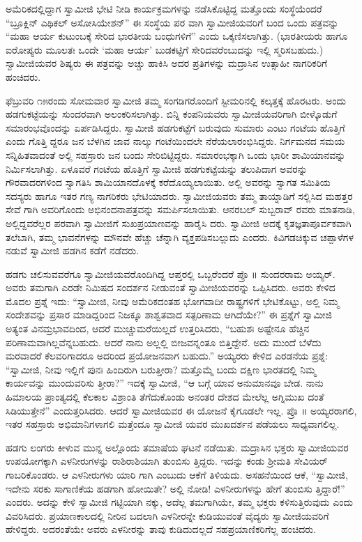 ಅಮೆರಿಕದಲ್ಲಿದ್ದಾಗ ಸ್ವಾಮೀಜಿ ಭೇಟಿ ನೀಡಿ ಕಾರ್ಯಕ್ರಮಗಳನ್ನು ನಡೆಸಿಕೊಟ್ಟಿದ್ದ ಮತ್ತೊಂದು ಸಂಸ್ಥೆಯೆಂದರೆ “ಬ್ರೂಕ್ಲಿನ್ ಎಥಿಕಲ್ ಅಸೋಸಿಯೇಶನ್​” ಈ ಸಂಸ್ಥೆಯ ಪರ ವಾಗಿ ಸ್ವಾಮೀಜಿಯವರಿಗೆ ಬಂದ ಒಂದು ಪತ್ರವನ್ನು “ಮಹಾ ಆರ್ಯ ಕುಟುಂಬಕ್ಕೆ ಸೇರಿದ ಭಾರತೀಯ ಬಂಧುಗಳಿಗೆ” ಎಂದು ಒಕ್ಕಣಿಸಲಾಗಿತ್ತು. (ಭಾರತೀಯರು ಹಾಗೂ ಐರೋಪ್ಯರು ಮೂಲತಃ ಒಂದೇ ‘ಮಹಾ ಆರ್ಯ’ ಬುಡಕಟ್ಟಿಗೆ ಸೇರಿದವರೆಂಬುದನ್ನು ಇಲ್ಲಿ ಸ್ಮರಿಸಬಹುದು.) ಸ್ವಾಮೀಜಿಯವರ ಶಿಷ್ಯರು ಈ ಪತ್ರವನ್ನು ಅಚ್ಚು ಹಾಕಿಸಿ ಅದರ ಪ್ರತಿಗಳನ್ನು ಮದ್ರಾಸಿನ ಉತ್ಸಾಹೀ ನಾಗರಿಕರಿಗೆ ಹಂಚಿದರು.

ಫೆಬ್ರುವರಿ ೧೫ರಂದು ಸೋಮವಾರ ಸ್ವಾಮೀಜಿ ತಮ್ಮ ಸಂಗಡಿಗರೊಂದಿಗೆ ಸ್ಟೀಮರಿನಲ್ಲಿ ಕಲ್ಕತ್ತಕ್ಕೆ ಹೊರಟರು. ಅಂದು ಹಡಗುಕಟ್ಟೆಯನ್ನು ಸುಂದರವಾಗಿ ಅಲಂಕರಿಸಲಾಗಿತ್ತು. ಬಿನ್ನಿ ಕಂಪನಿಯವರು ಸ್ವಾಮೀಜಿಯವರಿಗಾಗಿ ಬೀಳ್ಕೊಡುಗೆ ಸಮಾರಂಭವೊಂದನ್ನು ಏರ್ಪಡಿಸಿದ್ದರು. ಸ್ವಾಮೀಜಿ ಹಡಗುಕಟ್ಟೆಗೆ ಬರುವುದು ಸುಮಾರು ಎಂಟು ಗಂಟೆಯ ಹೊತ್ತಿಗೆ ಎಂದು ಗೊತ್ತಿ ದ್ದರೂ ಜನ ಬೆಳಗಿನ ಜಾವ ನಾಲ್ಕು ಗಂಟೆಯಿಂದಲೇ ನೆರೆಯಲಾರಂಭಿಸಿದ್ದರು. ನಿರ್ಗಮನದ ಸಮಯ ಸನ್ನಿಹಿತವಾದಂತೆ ಅಲ್ಲಿ ಸಹಸ್ರಾರು ಜನ ಬಂದು ಸೇರಿಬಿಟ್ಟಿದ್ದರು. ಸಮಾರಂಭಕ್ಕಾಗಿ ಒಂದು ಭಾರೀ ಶಾಮಿಯಾನವನ್ನು ನಿರ್ಮಿಸಲಾಗಿತ್ತು. ಏಳೂವರೆ ಗಂಟೆಯ ಹೊತ್ತಿಗೆ ಸ್ವಾಮೀಜಿ ಹಡಗುಕಟ್ಟೆಯನ್ನು ತಲುಪಿದಾಗ ಅವರನ್ನು ಗೌರವಾದರಗಳಿಂದ ಸ್ವಾಗತಿಸಿ ಶಾಮಿಯಾನದೊಳಕ್ಕೆ ಕರೆದೊಯ್ಯಲಾಯಿತು. ಅಲ್ಲಿ ಅವರನ್ನು ಸ್ವಾಗತ ಸಮಿತಿಯ ಸದಸ್ಯರು ಹಾಗೂ ಇತರ ಗಣ್ಯ ನಾಗರಿಕರು ಭೇಟಿಯಾದರು. ಸ್ವಾಮೀಜಿಯವರು ತಮ್ಮ ತಾಯ್ನಾಡಿಗೆ ಸಲ್ಲಿಸಿದ ಮಹತ್ತರ ಸೇವೆ ಗಾಗಿ ಅವರಿಗೊಂದು ಅಭಿನಂದನಾಪತ್ರವನ್ನು ಸಮರ್ಪಿಸಲಾಯಿತು. ಆನರಬಲ್ ಸುಬ್ಬರಾವ್ ರವರು ಮಾತನಾಡಿ, ಅಲ್ಲಿದ್ದವರೆಲ್ಲರ ಪರವಾಗಿ ಸ್ವಾಮೀಜಿಗೆ ಸುಖಪ್ರಯಾಣವನ್ನು ಹಾರೈಸಿ ದರು. ಸ್ವಾಮೀಜಿ ಅದಕ್ಕೆ ಕೃತಜ್ಞತಾಪೂರ್ವಕವಾಗಿ ತಲೆಬಾಗಿ, ತಮ್ಮ ಭಾವನೆಗಳನ್ನು ಮೌನವೇ ಹೆಚ್ಚು ಚೆನ್ನಾಗಿ ವ್ಯಕ್ತಪಡಿಸಬಲ್ಲುದು ಎಂದರು. ಕಿವಿಗಡಚಿಕ್ಕುವ ಚಪ್ಪಾಳೆಗಳ ನಡುವೆ ಸ್ವಾಮೀಜಿ ಹಡಗಿನ ಕಡೆಗೆ ನಡೆದರು.

ಹಡಗು ಚಲಿಸುವವರೆಗೂ ಸ್ವಾಮೀಜಿಯವರೊಂದಿಗಿದ್ದ ಆಪ್ತರಲ್ಲಿ ಒಬ್ಬರೆಂದರೆ ಪ್ರೊ ॥ ಸುಂದರರಾಮ ಅಯ್ಯರ್. ಅವರು ತಮಗಾಗಿ ಎರಡೇ ನಿಮಿಷದ ಸಂದರ್ಶನ ನೀಡುವಂತೆ ಸ್ವಾಮೀಜಿಯವರನ್ನು ಒಪ್ಪಿಸಿದರು. ಅವರು ಕೇಳಿದ ಮೊದಲ ಪ್ರಶ್ನೆ ಇದು: “ಸ್ವಾಮೀಜಿ, ನೀವು ಅಮೆರಿಕದಂತಹ ಭೋಗವಾದೀ ರಾಷ್ಟ್ರಗಳಿಗೆ ಭೇಟಿಕೊಟ್ಟು, ಅಲ್ಲಿ ನಿಮ್ಮ ಸಂದೇಶವನ್ನು ಪ್ರಸಾರ ಮಾಡಿದ್ದರಿಂದ ನಿಜಕ್ಕೂ ಶಾಶ್ವತವಾದ ಸತ್ಪರಿಣಾಮ ಆಗಿದೆಯೇ?” ಈ ಪ್ರಶ್ನೆಗೆ ಸ್ವಾಮೀಜಿ ಅತ್ಯಂತ ವಿನಮ್ರಭಾವದಿಂದ, ಆದರೆ ಮುಚ್ಚುಮರೆಯಿಲ್ಲದೆ ಉತ್ತರಿಸಿದರು, “ಬಹುಶಃ ಅಷ್ಟೇನೂ ಹೆಚ್ಚಿನ ಪರಿಣಾಮವಾಗಿಲ್ಲವೆನ್ನಬಹುದು. ಆದರೆ ನಾನು ಅಲ್ಲಲ್ಲಿ ಬೀಜವನ್ನಂತೂ ಬಿತ್ತಿದ್ದೇನೆ. ಅದು ಮುಂದೆ ಬೆಳೆದು ಮರವಾದರೆ ಕೆಲವರಿಗಾದರೂ ಅದರಿಂದ ಪ್ರಯೋಜನವಾಗ ಬಹುದು.” ಅಯ್ಯರರು ಕೇಳಿದ ಎರಡನೆಯ ಪ್ರಶ್ನೆ: “ಸ್ವಾಮೀಜಿ, ನೀವು ಇಲ್ಲಿಗೆ ಪುನಃ ಹಿಂದಿರುಗಿ ಬರುತ್ತೀರಾ? ಮತ್ತೊಮ್ಮೆ ಬಂದು ದಕ್ಷಿಣ ಭಾರತದಲ್ಲಿ ನಿಮ್ಮ ಕಾರ್ಯವನ್ನು ಮುಂದುವರಿಸು ತ್ತೀರಾ?” ಇದಕ್ಕೆ ಸ್ವಾಮೀಜಿ, “ಆ ಬಗ್ಗೆ ಯಾವ ಅನುಮಾನವೂ ಬೇಡ. ನಾನು ಹಿಮಾಲಯ ಪ್ರಾಂತ್ಯದಲ್ಲಿ ಕೆಲಕಾಲ ವಿಶ್ರಾಂತಿ ತೆಗೆದುಕೊಂಡು ಅನಂತರ ದೇಶದ ಮೇಲೆಲ್ಲ ಅಗ್ನಿಮುಖ ದಂತೆ ಸಿಡಿಯುತ್ತೇನೆ” ಎಂದುತ್ತರಿಸಿದರು. ಆದರೆ ಸ್ವಾಮೀಜಿಯವರ ಈ ಯೋಜನೆ ಕೈಗೂಡಲೇ ಇಲ್ಲ. ಪ್ರೊ ॥ ಅಯ್ಯರರಾಗಲಿ, ಇತರ ಸಹಸ್ರಾರು ಅಭಿಮಾನಿಗಳಾಗಲಿ ಮತ್ತೆಂದೂ ಸ್ವಾಮೀಜಿ ಯವರ ಮುಖದರ್ಶನ ಪಡೆಯಲು ಸಾಧ್ಯವಾಗಲಿಲ್ಲ.

ಹಡಗು ಲಂಗರು ಕೀಳುವ ಮುನ್ನ ಅಲ್ಲೊಂದು ತಮಾಷೆಯ ಘಟನೆ ನಡೆಯಿತು. ಮದ್ರಾಸಿನ ಭಕ್ತರು ಸ್ವಾಮೀಜಿಯವರ ಉಪಯೋಗಕ್ಕಾಗಿ ಎಳನೀರುಗಳನ್ನು ರಾಶಿರಾಶಿಯಾಗಿ ತುಂಬಿಸು ತ್ತಿದ್ದರು. ಇದನ್ನು ಕಂಡು ಶ್ರೀಮತಿ ಸೇವಿಯರ್ ಗಾಬರಿಕೊಂಡರು. ಆ ಎಳನೀರುಗಳು ಯಾರಿ ಗಾಗಿ ಎಂಬುದು ಆಕೆಗೆ ತಿಳಿಯದು. ಅಸಹನೆಯಿಂದ ಆಕೆ, “ಸ್ವಾಮೀಜಿ, ಇದೇನು ಸರಕು ಸಾಗಾಣಿಕೆಯ ಹಡಗಾಗಿ ಹೋಯಿತೇ? ಅಲ್ಲಿ ನೋಡಿ! ಎಳನೀರುಗಳನ್ನು ಹೇಗೆ ತುಂಬಿಸು ತ್ತಿದ್ದಾರೆ!” ಎಂದರು. ಅದನ್ನು ಕೇಳಿ ಸ್ವಾಮೀಜಿ ಗಟ್ಟಿಯಾಗಿ ನಕ್ಕು, ಅದೆಲ್ಲ ತಮಗಾಗಿಯೇ, ತಮ್ಮ ಭಕ್ತರು ಕಳಿಸುತ್ತಿರುವುದು ಎಂದು ವಿವರಿಸಿದರು. ಪ್ರಯಾಣಕಾಲದಲ್ಲಿ ನೀರಿನ ಬದಲಾಗಿ ಎಳನೀರನ್ನೇ ಕುಡಿಯುವಂತೆ ವೈದ್ಯರು ಸ್ವಾಮೀಜಿಯವರಿಗೆ ಹೇಳಿದ್ದರು. ಅದರಂತೆಯೇ ಅವರು ಎಳನೀರನ್ನು ತಾವು ಕುಡಿದುದಲ್ಲದೆ ಸಹಪ್ರಯಾಣಿಕರಿಗೆಲ್ಲ ಹಂಚಿದರು.

